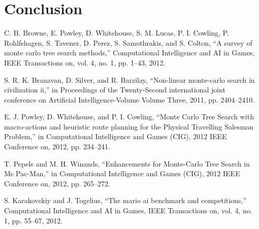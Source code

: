 \documentclass[10pt,a4paper]{article}
\begin{document}
\section{Conclusion}
\clearpage
\begin{thebibliography}{99}

  C. B. Browne, E. Powley, D. Whitehouse, S. M. Lucas, P. I. Cowling, P. Rohlfshagen, S. Tavener, D. Perez, S. Samothrakis, and S. Colton, “A survey of monte carlo tree search methods,” Computational Intelligence and AI in Games, IEEE Transactions on, vol. 4, no. 1, pp. 1–43, 2012.

S. R. K. Branavan, D. Silver, and R. Barzilay, “Non-linear monte-carlo search in civilization ii,” in Proceedings of the Twenty-Second international joint conference on Artificial Intelligence-Volume Volume Three, 2011, pp. 2404–2410.

E. J. Powley, D. Whitehouse, and P. I. Cowling, “Monte Carlo Tree Search with macro-actions and heuristic route planning for the Physical Travelling Salesman Problem,” in Computational Intelligence and Games (CIG), 2012 IEEE Conference on, 2012, pp. 234–241.

T. Pepels and M. H. Winands, “Enhancements for Monte-Carlo Tree Search in Ms Pac-Man,” in Computational Intelligence and Games (CIG), 2012 IEEE Conference on, 2012, pp. 265–272.

S. Karakovskiy and J. Togelius, “The mario ai benchmark and competitions,” Computational Intelligence and AI in Games, IEEE Transactions on, vol. 4, no. 1, pp. 55–67, 2012.

\end{thebibliography}
\end{document}
